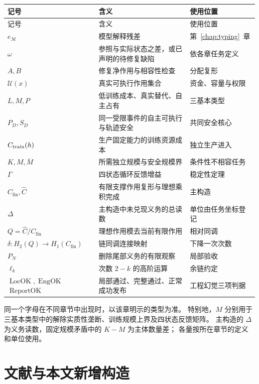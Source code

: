 \documentclass[12pt,a4paper,openany]{report}
\numberwithin{equation}{chapter}
\newcommand{\cfin}{C_{\mathrm{fin}}}
\newcommand{\chat}{\widehat C}
\newcommand{\LocOK}{\operatorname{LocOK}}
\newcommand{\EngOK}{\operatorname{EngOK}}
\newcommand{\ReportOK}{\operatorname{ReportOK}}
\begin{document}
\begin{CJK*}{UTF8}{gkai}
\begin{center}
\small
\begin{longtable}{P{0.23\textwidth}P{0.42\textwidth}P{0.26\textwidth}}
\toprule
记号 & 含义 & 使用位置\\
\midrule
\endfirsthead
\toprule
记号 & 含义 & 使用位置\\
\midrule
\endhead
$e_{\mathcal M}$ & 模型解释残差 & 第~\ref{chap:typing}~章\\
$\omega$ & 参照与实际状态之差，或已声明的待修复缺陷 & 依各章任务定义\\
$A,B$ & 修复净作用与相容性检查 & 分配复形\\
$\mathcal U(x)$ & 真实可执行作用集合 & 资金、容量与权限\\
$L,M,P$ & 低训练成本、真实替代、自主占有 & 三基本类型\\
$P_D,S_D$ & 同一受限事件的自主可执行与轨迹安全 & 共同安全核心\\
$C_{\rm train}(h)$ & 生产固定能力的训练资源成本 & 独立生产进入\\
$K,M,\overline M$ & 所需独立规模与安全规模界 & 条件性不相容任务\\
$\Gamma$ & 四状态循环反馈增益 & 稳定性定理\\
$\cfin,\chat$ & 有限支撑作用复形与理想乘积完成 & 主构造\\
$\Delta$ & 主构造中未兑现义务的总读数 & 单位由任务坐标登记\\
$Q=\chat/\cfin$ & 理想作用模去当前有限作用 & 相对同调\\
$\delta:H_2(Q)\to H_1(\cfin)$ & 链同调连接映射 & 下降一次次数\\
$P_N$ & 删除尾部义务的有限观察 & 局部验收\\
$\ell_k$ & 次数 $2-k$ 的高阶运算 & 余链约定\\
$\LocOK,\EngOK$\newline $\ReportOK$ & 局部通过、完整通过、正常成功发布 & 工程幻觉三项判据\\
\bottomrule
\end{longtable}
\end{center}

同一个字母在不同章节中出现时，以该章明示的类型为准。
特别地，$M$ 分别用于三基本类型中的解除实质性垄断、训练规模上界及四状态反馈矩阵。
主构造的 $\Delta$ 为义务读数，固定规模矛盾中的 $K-M$ 为主体数量差；
各量按所在章节的定义和单位使用。

\section{文献与本文新增构造}


\end{CJK*}
\end{document}
